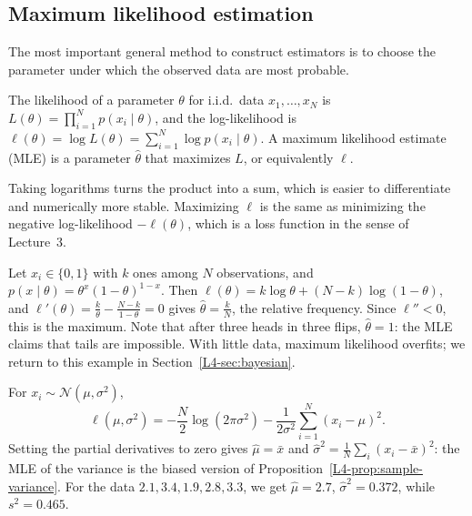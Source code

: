 \subsection{Maximum likelihood estimation}

The most important general method to construct estimators is to choose the parameter under which the observed data are most probable.

\begin{definition}\label{L4-def:mle}
    The likelihood of a parameter $\theta$ for i.i.d.\ data $x_1, \ldots, x_N$ is $L(\theta) = \prod_{i=1}^N p(x_i \mid \theta)$, and the log-likelihood is $\ell(\theta) = \log L(\theta) = \sum_{i=1}^N \log p(x_i \mid \theta)$. A maximum likelihood estimate (MLE) is a parameter $\hat\theta$ that maximizes $L$, or equivalently $\ell$.
\end{definition}

Taking logarithms turns the product into a sum, which is easier to differentiate and numerically more stable. Maximizing $\ell$ is the same as minimizing the negative log-likelihood $-\ell(\theta)$, which is a loss function in the sense of Lecture~3.

\begin{example}[Bernoulli]\label{L4-ex:mle-bernoulli}
    Let $x_i \in \{0, 1\}$ with $k$ ones among $N$ observations, and $p(x \mid \theta) = \theta^x(1 - \theta)^{1 - x}$. Then $\ell(\theta) = k\log\theta + (N - k)\log(1 - \theta)$, and $\ell'(\theta) = \frac{k}{\theta} - \frac{N - k}{1 - \theta} = 0$ gives $\hat\theta = \frac{k}{N}$, the relative frequency. Since $\ell'' < 0$, this is the maximum. Note that after three heads in three flips, $\hat\theta = 1$: the MLE claims that tails are impossible. With little data, maximum likelihood overfits; we return to this example in Section~\ref{L4-sec:bayesian}.
\end{example}

\begin{example}[Gaussian]\label{L4-ex:mle-gaussian}
    For $x_i \sim \mathcal{N}(\mu, \sigma^2)$,
    \[\ell(\mu, \sigma^2) = -\frac{N}{2}\log(2\pi\sigma^2) - \frac{1}{2\sigma^2}\sum_{i=1}^N (x_i - \mu)^2.\]
    Setting the partial derivatives to zero gives $\hat\mu = \bar x$ and $\hat\sigma^2 = \frac{1}{N}\sum_i (x_i - \bar x)^2$: the MLE of the variance is the biased version of Proposition~\ref{L4-prop:sample-variance}. For the data $2.1, 3.4, 1.9, 2.8, 3.3$, we get $\hat\mu = 2.7$, $\hat\sigma^2 = 0.372$, while $s^2 = 0.465$.
\end{example}

